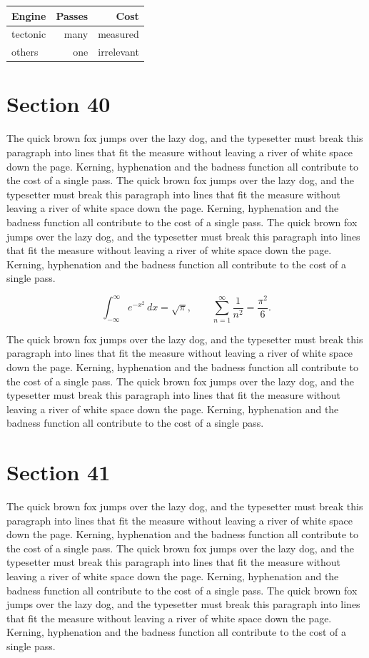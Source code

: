 \documentclass{article}
\begin{document}
\begin{center}
\begin{tabular}{lrr}
\toprule
Engine & Passes & Cost \\
\midrule
tectonic & many & measured \\
others & one & irrelevant \\
\bottomrule
\end{tabular}
\end{center}

\section{Section 40}
The quick brown fox jumps over the lazy dog, and the typesetter must break this paragraph into lines that fit the measure without leaving a river of white space down the page. Kerning, hyphenation and the badness function all contribute to the cost of a single pass. The quick brown fox jumps over the lazy dog, and the typesetter must break this paragraph into lines that fit the measure without leaving a river of white space down the page. Kerning, hyphenation and the badness function all contribute to the cost of a single pass. The quick brown fox jumps over the lazy dog, and the typesetter must break this paragraph into lines that fit the measure without leaving a river of white space down the page. Kerning, hyphenation and the badness function all contribute to the cost of a single pass. 

\begin{equation}
\int_{-\infty}^{\infty} e^{-x^{2}}\,dx = \sqrt{\pi}, \qquad
\sum_{n=1}^{\infty} \frac{1}{n^{2}} = \frac{\pi^{2}}{6}.
\end{equation}

The quick brown fox jumps over the lazy dog, and the typesetter must break this paragraph into lines that fit the measure without leaving a river of white space down the page. Kerning, hyphenation and the badness function all contribute to the cost of a single pass. The quick brown fox jumps over the lazy dog, and the typesetter must break this paragraph into lines that fit the measure without leaving a river of white space down the page. Kerning, hyphenation and the badness function all contribute to the cost of a single pass. 
\section{Section 41}
The quick brown fox jumps over the lazy dog, and the typesetter must break this paragraph into lines that fit the measure without leaving a river of white space down the page. Kerning, hyphenation and the badness function all contribute to the cost of a single pass. The quick brown fox jumps over the lazy dog, and the typesetter must break this paragraph into lines that fit the measure without leaving a river of white space down the page. Kerning, hyphenation and the badness function all contribute to the cost of a single pass. The quick brown fox jumps over the lazy dog, and the typesetter must break this paragraph into lines that fit the measure without leaving a river of white space down the page. Kerning, hyphenation and the badness function all contribute to the cost of a single pass. 
\end{document}
